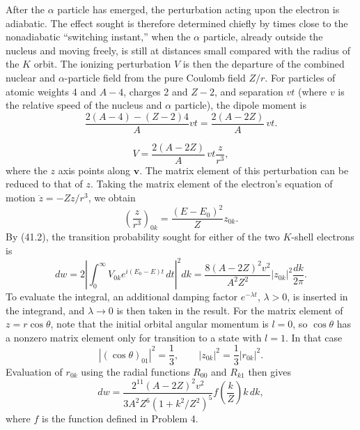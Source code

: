 \SolutionHeading After the $\alpha$ particle has emerged, the perturbation
acting upon the electron is adiabatic. The effect sought is therefore
determined chiefly by times close to the nonadiabatic ``switching instant,''
when the $\alpha$ particle, already outside the nucleus and moving freely, is
still at distances small compared with the radius of the $K$ orbit. The
ionizing perturbation $V$ is then the departure of the combined nuclear and
$\alpha$-particle field from the pure Coulomb field $Z/r$. For particles of
atomic weights 4 and $A-4$, charges 2 and $Z-2$, and separation $vt$ (where
$v$ is the relative speed of the nucleus and $\alpha$ particle), the dipole
moment is
\[
  \frac{2(A-4)-(Z-2)4}{A}vt=\frac{2(A-2Z)}A\,vt.
\]

\[
  V=\frac{2(A-2Z)}A\,vt\frac z{r^3},
\]
where the $z$ axis points along $\mathbf v$. The matrix element of this
perturbation can be reduced to that of $z$. Taking the matrix element of the
electron's equation of motion $\ddot z=-Zz/r^3$, we obtain
\[
  \left(\frac z{r^3}\right)_{0k}=\frac{(E-E_0)^2}{Z}z_{0k}.
\]
By (41.2), the transition probability sought for either of the two $K$-shell
electrons is
\[
  dw=2\left|\int_0^\infty V_{0k}e^{i(E_0-E)t}\,dt\right|^2dk
  =\frac{8(A-2Z)^2v^2}{A^2Z^2}|z_{0k}|^2\frac{dk}{2\pi}.
\]
To evaluate the integral, an additional damping factor $e^{-\lambda t}$,
$\lambda>0$, is inserted in the integrand, and $\lambda\to0$ is then taken in
the result. For the matrix element of $z=r\cos\theta$, note that the initial
orbital angular momentum is $l=0$, so $\cos\theta$ has a nonzero matrix
element only for transition to a state with $l=1$. In that case
\[
  |(\cos\theta)_{01}|^2=\frac13,\qquad
  |z_{0k}|^2=\frac13|r_{0k}|^2.
\]
Evaluation of $r_{0k}$ using the radial functions $R_{00}$ and $R_{k1}$ then
gives
\[
  dw=\frac{2^{11}(A-2Z)^2v^2}{3A^2Z^6(1+k^2/Z^2)^5}
  f\left(\frac kZ\right)k\,dk,
\]
where $f$ is the function defined in Problem 4.
